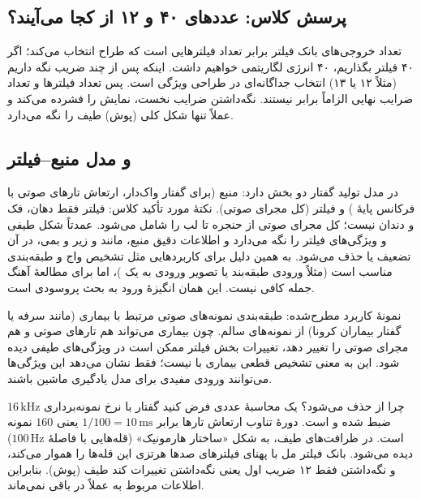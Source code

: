 \subsection{پرسش کلاس: عددهای ۴۰ و ۱۲ از کجا می‌آیند؟}
تعداد خروجی‌های بانک فیلتر برابر تعداد فیلترهایی است که طراح انتخاب می‌کند؛ اگر ۴۰ فیلتر بگذاریم، ۴۰ انرژی لگاریتمی خواهیم داشت. اینکه پس از  چند ضریب نگه داریم (مثلاً ۱۲ یا ۱۳) انتخاب جداگانه‌ای در طراحی ویژگی است. پس تعداد فیلترها و تعداد ضرایب نهایی الزاماً برابر نیستند. نگه‌داشتن ضرایب نخست، نمایش را فشرده می‌کند و عملاً تنها شکل کلی (پوش) طیف را نگه می‌دارد.

\subsection{ و مدل منبع–فیلتر}
در مدل  تولید گفتار دو بخش دارد: منبع (برای گفتار واک‌دار، ارتعاش تارهای صوتی با فرکانس پایهٔ ) و فیلتر (کل مجرای صوتی). نکتهٔ مورد تأکید کلاس: فیلتر فقط دهان، فک و دندان نیست؛ کل مجرای صوتی از حنجره تا لب را شامل می‌شود.  عمدتاً شکل طیفی و ویژگی‌های فیلتر را نگه می‌دارد و اطلاعات دقیق منبع، مانند  و زیر و بمی، در آن تضعیف یا حذف می‌شود. به همین دلیل  برای کاربردهایی مثل تشخیص واج و طبقه‌بندی مناسب است (مثلاً ورودی طبقه‌بند یا تصویر ورودی به یک )، اما برای مطالعهٔ آهنگ جمله کافی نیست. این همان انگیزهٔ ورود به بحث پروسودی است.

نمونهٔ کاربرد مطرح‌شده: طبقه‌بندی نمونه‌های صوتی مرتبط با بیماری (مانند سرفه یا گفتار بیماران کرونا) از نمونه‌های سالم. چون بیماری می‌تواند هم تارهای صوتی و هم مجرای صوتی را تغییر دهد، تغییرات بخش فیلتر ممکن است در ویژگی‌های طیفی دیده شود. این به معنی تشخیص قطعی بیماری با  نیست؛ فقط نشان می‌دهد این ویژگی‌ها می‌توانند ورودی مفیدی برای مدل یادگیری ماشین باشند.

\begin{addedbox}{چرا  از  حذف می‌شود؟ یک محاسبهٔ عددی}
فرض کنید گفتار با نرخ نمونه‌برداری $16\,\text{kHz}$ ضبط شده و  است. دورهٔ تناوب ارتعاش تارها برابر $1/100=10\,\text{ms}$ یعنی $160$ نمونه است. در ظرافت‌های طیف،  به شکل «ساختار هارمونیک» (قله‌هایی با فاصلهٔ $100\,\text{Hz}$) دیده می‌شود. بانک فیلتر مل با پهنای فیلترهای صدها هرتزی این قله‌ها را هموار می‌کند، و نگه‌داشتن فقط ۱۲ ضریب اول  یعنی نگه‌داشتن تغییرات کند طیف (پوش). بنابراین اطلاعات مربوط به  عملاً در  باقی نمی‌ماند.
\end{addedbox}

